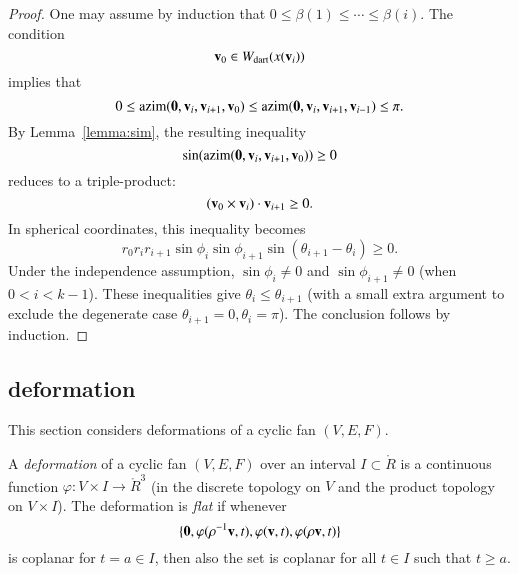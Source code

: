 \begin{proof}
 One may assume by induction that $0\le \beta(1)\le\cdots\le \beta(i)$.  The condition
$$
{\mathbf v}_0\in W_{\text{dart}}(x({\mathbf v}_i))
$$
implies that
$$
0 \le {\operatorname{azim}}({\mathbf 0},{\mathbf v}_i,{\mathbf v}_{i+1},{\mathbf v}_0)\le {\operatorname{azim}}({\mathbf 0},{\mathbf v}_i,{\mathbf v}_{i+1},{\mathbf v}_{i-1})\le\pi.
$$
By Lemma~\ref{lemma:sim}, the resulting inequality
$$
\sin({\operatorname{azim}}({\mathbf 0},{\mathbf v}_i,{\mathbf v}_{i+1},{\mathbf v}_0))\ge 0
$$
reduces to a triple-product:
$$
({\mathbf v}_0 \times {\mathbf v}_i)\cdot {\mathbf v}_{i+1}\ge 0.
$$
In spherical coordinates, this inequality becomes
$$
r_0r_ir_{i+1}\sin\phi_i\sin\phi_{i+1}\sin(\theta_{i+1}-\theta_i)\ge0.
$$
Under the independence assumption, $\sin\phi_i\ne0$ and $\sin\phi_{i+1}\ne0$ (when $0< i < k-1$).    These inequalities give $\theta_i\le\theta_{i+1}$ (with a small extra argument to exclude the degenerate case $\theta_{i+1}=0,\theta_i=\pi$).  The conclusion follows by induction.
%
\end{proof}



\subsection{deformation}\label{sec:deformation}

This section considers deformations of a cyclic fan $(V,E,F)$.

\begin{definition}
A {\it deformation} of a cyclic fan $(V,E,F)$ over an interval $I\subset\ring{R}$
is a 
continuous function $\varphi:V\times I \to\ring{R}^3$ (in the discrete topology on $V$ and the product topology on $V\times I$).
The deformation is {\it flat} if whenever
$$\{{\mathbf 0},\varphi(\rho^{-1}{\mathbf v},t),\varphi({\mathbf v},t),\varphi(\rho {\mathbf v},t)\}$$
is coplanar for $t=a\in I$, then also the set is coplanar for all $t\in I$ such
that $t\ge a$.
\end{definition}
%
%
%

